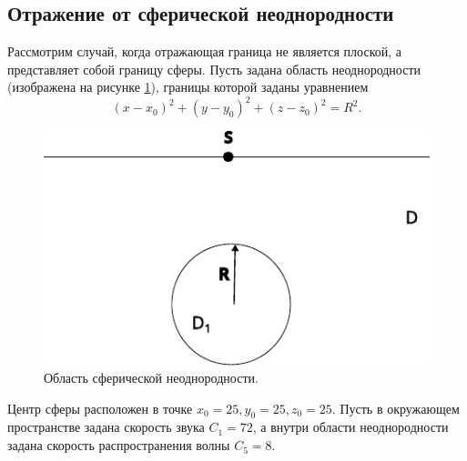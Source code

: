 \documentclass[a4paper, fontsize=14pt]{article}
\begin{document}
	\subsection{Отражение от сферической неоднородности}

	Рассмотрим случай, когда отражающая граница не является плоской, а представляет собой границу сферы. Пусть задана область неоднородности (изображена на рисунке \ref{fig:spheremod}), границы которой заданы уравнением 
	\begin{equation}
		(x-x_0)^2 + (y-y_0)^2 + (z-z_0)^2 = R^2.
	\end{equation}
	\begin{figure}[h]
		\centering
		\includegraphics{sphere_mod.pdf}
		\caption{Область сферической неоднородности.}
		\label{fig:spheremod}
	\end{figure}
	
	Центр сферы расположен в точке $x_0 = 25, y_0 = 25,z_0 = 25$.
	Пусть в окружающем пространстве задана скорость звука $C_1 = 72$, а внутри области неоднородности задана скорость распространения волны $C_5 = 8$.
	
\end{document}
